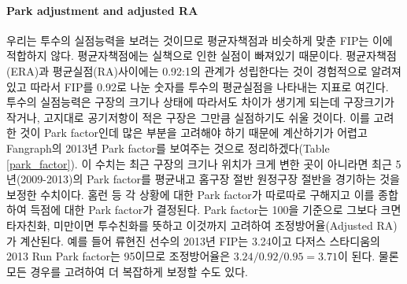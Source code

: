 \documentclass[11pt]{article}
\begin{document}
\paragraph{Park adjustment and adjusted RA}
우리는 투수의 실점능력을 보려는 것이므로 평균자책점과 비슷하게 맞춘 FIP는 이에 적합하지 않다. 평균자책점에는 실책으로 인한 실점이 빠져있기 때문이다. 평균자책점(ERA)과 평균실점(RA)사이에는 0.92:1의 관계가 성립한다는 것이 경험적으로 알려져 있고 따라서 FIP를 0.92로 나눈 숫자를 투수의 평균실점을 나타내는 지표로 여긴다\cite{runenv_pitch}. \\
투수의 실점능력은 구장의 크기나 상태에 따라서도 차이가 생기게 되는데 구장크기가 작거나, 고지대로 공기저항이 적은 구장은 그만큼 실점하기도 쉬울 것이다. 이를 고려한 것이 Park factor인데 많은 부분을 고려해야 하기 때문에 계산하기가 어렵고 Fangraph의 2013년 Park factor를 보여주는 것으로 정리하겠다(Table \ref{park_factor}). 이 수치는 최근 구장의 크기나 위치가 크게 변한 곳이 아니라면 최근 5년(2009-2013)의 Park factor를 평균내고 홈구장 절반 원정구장 절반을 경기하는 것을 보정한 수치이다. 홈런 등 각 상황에 대한 Park factor가 따로따로 구해지고 이를 종합하여 득점에 대한 Park factor가 결정된다. Park factor는 100을 기준으로 그보다 크면 타자친화, 미만이면 투수친화를 뜻하고 이것까지 고려하여 조정방어율(Adjusted RA)가 계산된다. 예를 들어 류현진 선수의 2013년 FIP는 3.24이고 다저스 스타디움의 2013 Run Park factor는 95이므로 조정방어율은 $3.24/0.92/0.95=3.71$이 된다. 물론 모든 경우를 고려하여 더 복잡하게 보정할 수도 있다.
\end{document}
